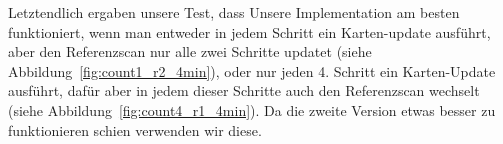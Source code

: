 Letztendlich ergaben unsere Test, dass Unsere Implementation am besten funktioniert, wenn man entweder in jedem Schritt ein Karten-update ausführt, aber den Referenzscan nur alle zwei Schritte updatet (siehe Abbildung~\ref{fig:count1_r2_4min}), oder nur jeden 4. Schritt ein Karten-Update ausführt, dafür aber in jedem dieser Schritte auch den Referenzscan wechselt (siehe Abbildung~\ref{fig:count4_r1_4min}). Da die zweite Version etwas besser zu funktionieren schien verwenden wir diese.